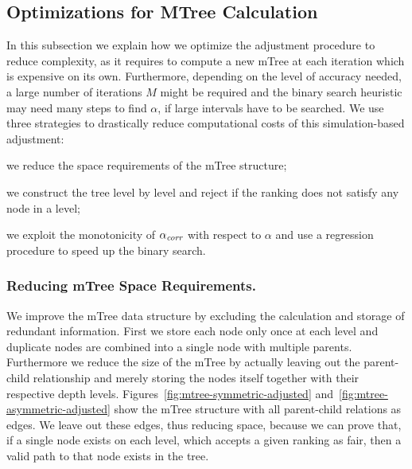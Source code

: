 \subsection{Optimizations for MTree Calculation}
\label{subsec:mtree-optimization}
In this subsection we explain how we optimize the adjustment procedure to reduce complexity, as it requires to compute a new mTree at each iteration which is expensive on its own. 
%
Furthermore, depending on the level of accuracy needed, a large number of iterations $M$ might be required and the binary search heuristic may need many steps to find $\alpha$, if large intervals have to be searched.
%
We use three strategies to drastically reduce computational costs of this simulation-based adjustment:
%
\begin{inparaenum}[(i)]
%
\item we reduce the space requirements of the mTree structure;
%
\item we construct the tree level by level and reject if the ranking does not satisfy any node in a level;
%
\item we exploit the monotonicity of $\alpha_\textit{corr}$ with respect to $\alpha$ and use a regression procedure to speed up the binary search.
\end{inparaenum}

\subsubsection{Reducing mTree Space Requirements.} 
We improve the mTree data structure by excluding the calculation and storage of redundant information.
%
First we store each node only once at each level and duplicate nodes are combined into a single node with multiple parents.
%
Furthermore we reduce the size of the mTree by actually leaving out the parent-child relationship and merely storing the nodes itself together with their respective depth levels.
%
Figures~\ref{fig:mtree-symmetric-adjusted} and~\ref{fig:mtree-asymmetric-adjusted} show the mTree structure with all parent-child relations as edges.
%
We leave out these edges, thus reducing space, because we can prove that, if a single node exists on each level, which accepts a given ranking as fair, then a valid path to that node exists in the tree.

